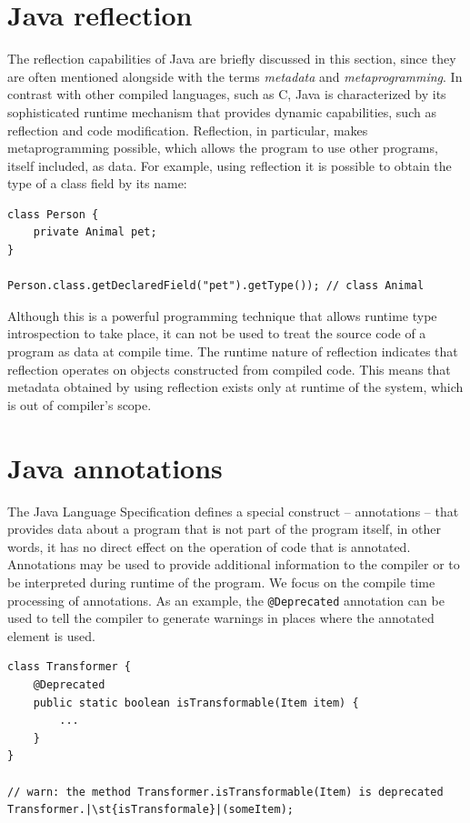 \section{Java reflection}
The reflection capabilities of Java are briefly discussed in this section, since they are often mentioned alongside with the terms \textit{metadata} and \textit{metaprogramming}.
In contrast with other compiled languages, such as C, Java is characterized by its sophisticated runtime mechanism that provides dynamic capabilities, such as reflection and code modification.
Reflection, in particular, makes metaprogramming possible, which allows the program to use other programs, itself included, as data.
For example, using reflection it is possible to obtain the type of a class field by its name:

\begin{verbatim}
class Person {
    private Animal pet;
}

Person.class.getDeclaredField("pet").getType()); // class Animal
\end{verbatim}

Although this is a powerful programming technique that allows runtime type introspection to take place, it can not be used to treat the source code of a program as data at compile time.
The runtime nature of reflection indicates that reflection operates on objects constructed from compiled code.
This means that metadata obtained by using reflection exists only at runtime of the system, which is out of compiler's scope.

\section{Java annotations}
The Java Language Specification \cite{jls} defines a special construct – annotations – that provides data about a program that is not part of the program itself, in other words, it has no direct effect on the operation of code that is annotated.
Annotations may be used to provide additional information to the compiler or to be interpreted during runtime of the program.
We focus on the compile time processing of annotations.
As an example, the \texttt{@Deprecated} annotation can be used to tell the compiler to generate warnings in places where the annotated element is used.

\begin{verbatim}
class Transformer {
    @Deprecated
    public static boolean isTransformable(Item item) {
        ...
    }
}

// warn: the method Transformer.isTransformable(Item) is deprecated
Transformer.|\st{isTransformale}|(someItem);
\end{verbatim}

